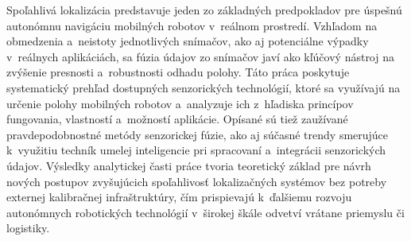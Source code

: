 Spoľahlivá lokalizácia predstavuje jeden zo základných predpokladov pre úspešnú autonómnu navigáciu mobilných robotov v~reálnom prostredí. Vzhľadom na obmedzenia a~neistoty jednotlivých snímačov, ako aj potenciálne výpadky v~reálnych aplikáciách, sa fúzia údajov zo snímačov javí ako kľúčový nástroj na zvýšenie presnosti a~robustnosti odhadu polohy. Táto práca poskytuje systematický prehľad dostupných senzorických technológií, ktoré sa využívajú na určenie polohy mobilných robotov a~analyzuje ich z~hľadiska princípov fungovania, vlastností a~možností aplikácie. Opísané sú tiež zaužívané pravdepodobnostné metódy senzorickej fúzie, ako aj súčasné trendy smerujúce k~využitiu techník umelej inteligencie pri spracovaní a~integrácii senzorických údajov. Výsledky analytickej časti práce tvoria teoretický základ pre návrh nových postupov zvyšujúcich spoľahlivosť lokalizačných systémov bez potreby externej kalibračnej infraštruktúry, čím prispievajú k~ďalšiemu rozvoju autonómnych robotických technológií v~širokej škále odvetví vrátane priemyslu či logistiky.